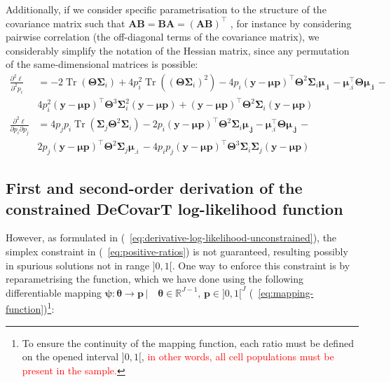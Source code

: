 \documentclass[long, final]{jobim}
\DeclareMathOperator*{\Tr}{Tr}
\newcommand \RR {\mathbb{R}}
\begin{document}
Additionally, if we consider specific parametrisation to the structure of the covariance matrix such that $\boldsymbol{A}\boldsymbol{B}=\boldsymbol{B}\boldsymbol{A}=(\boldsymbol{A}\boldsymbol{B})^\top$ , for instance by considering pairwise correlation (the off-diagonal terms of the covariance matrix), we considerably simplify the notation of the Hessian matrix, since any permutation of the same-dimensional matrices is possible:
\begin{equation*}
    \begin{aligned}
 \frac{\partial^2 \ell}{\partial^2 p_i}& =
-2\Tr \left(\boldsymbol{\Theta}\boldsymbol{\Sigma}_i\right) + 4p_i^2 \Tr \left(\left(\boldsymbol{\Theta}\boldsymbol{\Sigma}_i\right)^2\right)
-4p_i(\boldsymbol{y} - \boldsymbol{\mu} \boldsymbol{p})^\top\boldsymbol{\Theta}^2 \boldsymbol{\Sigma}_i  \boldsymbol{\mu_{.i}}\, - \boldsymbol{\mu}_{.i}^\top\boldsymbol{\Theta} \boldsymbol{\mu_{.i}} \, - \\
&4p_i^2 (\boldsymbol{y} - \boldsymbol{\mu} \boldsymbol{p})^\top \boldsymbol{\Theta}^3  \boldsymbol{\Sigma}_i^2 (\boldsymbol{y} - \boldsymbol{\mu} \boldsymbol{p}) + (\boldsymbol{y} - \boldsymbol{\mu} \boldsymbol{p})^\top \boldsymbol{\Theta}^2  \boldsymbol{\Sigma}_i  (\boldsymbol{y} - \boldsymbol{\mu} \boldsymbol{p})\\
\frac{\partial^2 \ell}{\partial p_i \partial p_j} &=
4p_j p_i \Tr \left(\boldsymbol{\Sigma}_j \boldsymbol{\Theta}^2\boldsymbol{\Sigma}_i \right)
-2p_i(\boldsymbol{y} - \boldsymbol{\mu} \boldsymbol{p})^\top\boldsymbol{\Theta}^2 \boldsymbol{\Sigma}_i  \boldsymbol{\mu_{.j}} - \boldsymbol{\mu}_{.i}^\top\boldsymbol{\Theta} \boldsymbol{\mu_{.j}} \, - \\
& 2p_j (\boldsymbol{y} - \boldsymbol{\mu} \boldsymbol{p})^\top \boldsymbol{\Theta}^2 \boldsymbol{\Sigma}_j \boldsymbol{\mu}_{.i}\, -
4p_ip_j(\boldsymbol{y} - \boldsymbol{\mu} \boldsymbol{p})^\top\boldsymbol{\Theta}^3\boldsymbol{\Sigma}_i \boldsymbol{\Sigma}_j (\boldsymbol{y} - \boldsymbol{\mu} \boldsymbol{p})
  \end{aligned}
\end{equation*}


\subsection{First and second-order derivation of the constrained DeCovarT log-likelihood function}
\label{subsubsec:contrained-optimisation}


However, as formulated in (\equationname~\ref{eq:derivative-log-likelihood-unconstrained}), the simplex constraint in (\equationname~\ref{eq:positive-ratios}) is not guaranteed, resulting possibly in spurious solutions not in range $]0, 1[$. One way to enforce this constraint is by reparametrising the function, which we have done using the following differentiable mapping $\boldsymbol{\psi}:\boldsymbol{\theta}  \to  \boldsymbol{p} \, | \quad  \boldsymbol{\theta} \in \RR^{J-1} , \, \boldsymbol{p} \in ]0, 1[^{J}$ (\equationname~\ref{eq:mapping-function})\footnote{To ensure the continuity of the mapping function, each ratio must be defined on the opened interval $]0, 1[$, \textcolor{red}{in other words, all cell populations must be present in the sample.}}:
\end{document}
